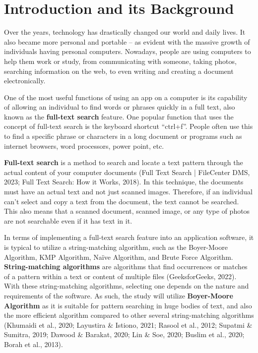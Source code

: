 \part{Introduction and its Background}

\hspace\parindent
Over the years, technology has drastically changed our world and daily lives. It also became more personal and portable – as evident with the massive growth of individuals having personal computers. Nowadays, people are using computers to help them work or study, from communicating with someone, taking photos, searching information on the web, to even writing and creating a document electronically.

\hfill

One of the most useful functions of using an app on a computer is its capability of allowing an
individual to find words or phrases quickly in a full text, also known as the \textbf{full-text
search} feature. One popular function that uses the concept of full-text search is the keyboard shortcut “ctrl+f”. People often use this to find a specific phrase or characters in a long document or programs such as internet browsers, word processors, power point, etc.

\hfill

\textbf{Full-text search} is a method to search and locate a text pattern through the actual content of your computer documents (Full Text Search | FileCenter DMS, 2023; Full Text Search: How it Works, 2018). In this technique, the documents must have an actual text and not just scanned images. Therefore, if an individual can’t select and copy a text from the document, the text cannot be searched. This also means that a scanned document, scanned image, or any type of photos are not searchable even if it has text in it.

\hfill

In terms of implementing a full-text search feature into an application software, it is typical to
utilize a string-matching algorithm, such as the Boyer-Moore Algorithm, KMP Algorithm, Naïve
Algorithm, and Brute Force Algorithm. \textbf{String-matching algorithms} are algorithms that find
occurrences or matches of a pattern within a text or content of multiple files (GeeksforGeeks,
2022). With these string-matching algorithms, selecting one depends on the nature and requirements
of the software. As such, the study will utilize \textbf{Boyer-Moore Algorithm} as it is suitable for
pattern searching in huge bodies of text, and also the more efficient algorithm compared to other several
string-matching algorithms (Khumaidi et al., 2020; Layustira \& Istiono, 2021; Rasool et al., 2012; 
Supatmi \& Sumitra, 2019; Dawood \& Barakat, 2020; Lin \& Soe, 2020; Buslim et al., 2020; Borah et al., 2013).

